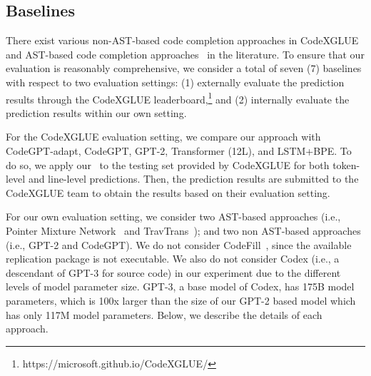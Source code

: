 \subsection{Baselines}

There exist various non-AST-based code completion approaches in CodeXGLUE~\cite{lu2021codexglue,radford2019language} and AST-based code completion approaches~\cite{kim2021code,izadi2022codefill,li2017code} in the literature.
To ensure that our evaluation is reasonably comprehensive, we consider a total of seven (7) baselines with respect to two evaluation settings: (1) externally evaluate the prediction results through the CodeXGLUE leaderboard,\footnote{https://microsoft.github.io/CodeXGLUE/} and (2) internally evaluate the prediction results within our own setting.

For the CodeXGLUE evaluation setting, we compare our approach with CodeGPT-adapt, CodeGPT, GPT-2, Transformer (12L), and LSTM+BPE.
To do so, we apply our \our~to the testing set provided by CodeXGLUE for both token-level and line-level predictions.
Then, the prediction results are submitted to the CodeXGLUE team to obtain the results based on their evaluation setting.

For our own evaluation setting, we consider two AST-based approaches (i.e., Pointer Mixture Network~\cite{li2017code} and TravTrans~\cite{kim2021code}); and two non AST-based approaches (i.e., GPT-2 and CodeGPT).
We do not consider CodeFill~\cite{izadi2022codefill}, since the available replication package is not executable. 
We also do not consider Codex (i.e., a descendant of GPT-3 for source code) in our experiment due to the different levels of model parameter size. 
GPT-3, a base model of Codex, has 175B model parameters, which is 100x larger than the size of our GPT-2 based model which has only 117M model parameters.
Below, we describe the details of each approach. 












